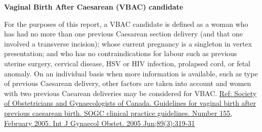 \documentclass[
]{krantz}
\begin{document}
\textbf{Vaginal Birth After Caesarean (VBAC) candidate}

For the purposes of this report, a VBAC candidate is defined as a woman who has had no more than one previous Caesarean section delivery (and that one involved a transverse incision); whose current pregnancy is a singleton in vertex presentation; and who has no contraindications for labour such as previous uterine surgery, cervical disease, HSV or HIV infection, prolapsed cord, or fetal anomaly. On an individual basis when more information is available, such as type of previous Caesarean delivery, other factors are taken into account and women with two previous Caearean deliveries may be considered for VBAC. \href{https://pubmed.ncbi.nlm.nih.gov/16001462/}{Ref: Society of Obstetricians and Gynaecologists of Canada. Guidelines for vaginal birth after previous caesarean birth. SOGC clinical practice guidelines. Number 155, February 2005. Int J Gynaecol Obstet. 2005 Jun;89(3):319-31}
\end{document}
